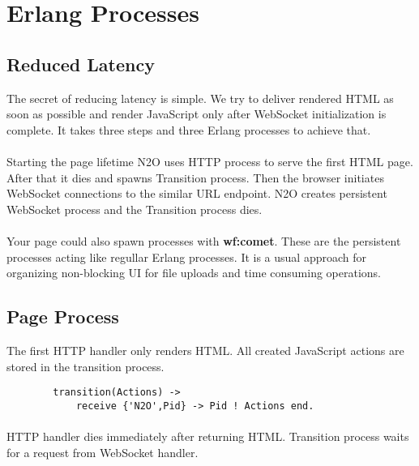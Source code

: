 \section{Erlang Processes}

\subsection{Reduced Latency}
The secret of reducing latency is simple. We try to deliver rendered HTML
as soon as possible and render JavaScript only after WebSocket initialization is complete.
It takes three steps and three Erlang processes to achieve that.


\paragraph{}
Starting the page lifetime N2O uses HTTP process to serve the first HTML page.
After that it dies and spawns Transition process.
Then the browser initiates WebSocket connections to the similar URL endpoint.
N2O creates persistent WebSocket process and the Transition process dies.

\paragraph{}
Your page could also spawn processes with {\bf wf:comet}.
These are the persistent processes acting like regullar Erlang processes.
It is a usual approach for organizing non-blocking UI for file uploads and time consuming operations.

\subsection{Page Process}
The first HTTP handler only renders HTML. All created
JavaScript actions are stored in the transition process.

\vspace{1\baselineskip}
\begin{lstlisting}
        transition(Actions) ->
            receive {'N2O',Pid} -> Pid ! Actions end.
\end{lstlisting}

\paragraph{}
HTTP handler dies immediately after returning HTML. Transition process
waits for a request from WebSocket handler.


